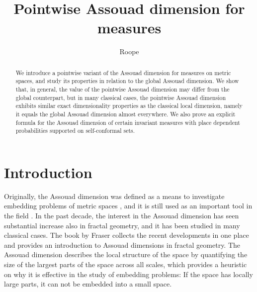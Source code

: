 \documentclass{PRM}
\theoremstyle{plain}
\theoremstyle{definition}
\theoremstyle{remark}
\begin{document}
\title{Pointwise Assouad dimension for measures}

\author{Roope }

\address{Research Unit of Mathematical Sciences\\  P.O.Box 8000, FI-90014, University of Oulu, Finland }

\begin{abstract}
    We introduce a pointwise variant of the Assouad dimension for measures on metric spaces, and study its properties in relation to the global Assouad dimension. We show that, in general, the value of the pointwise Assouad dimension may differ from the global counterpart, but in many classical cases, the pointwise Assouad dimension exhibits similar exact dimensionality properties as the classical local dimension, namely it equals the global Assouad dimension almost everywhere. We also prove an explicit formula for the Assouad dimension of certain invariant measures with place dependent probabilities supported on self-conformal sets.
\end{abstract}




\maketitle

\section{Introduction}
Originally, the Assouad dimension was defined as a means to investigate embedding problems of metric spaces \cite{A}, and it is still used as an important tool in the field \cite{T}. In the past decade, the interest in the Assouad dimension has seen substantial increase also in fractal geometry, and it has been studied in many classical cases. The book by Fraser \cite{F} collects the recent developments in one place and provides an introduction to Assouad dimensions in fractal geometry. The Assouad dimension describes the local structure of the space by quantifying the size of the largest parts of the space across all scales, which provides a heuristic on why it is effective in the study of embedding problems: If the space has locally large parts, it can not be embedded into a small space.
\end{document}
